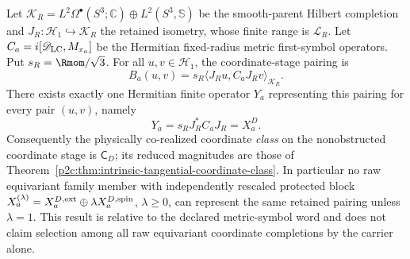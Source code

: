 \documentclass[12pt,a4paper]{article}
\begin{document}
\begin{proposition}
\label{p2c:prop:v265-matrix-element-host-inheritance}
Let \(\mathscr K_R=L^2\Omega^\bullet(S^3;\mathbb C)\oplus
L^2(S^3,\mathbb S)\) be the smooth-parent Hilbert completion and
\(J_R:\mathcal H_1\hookrightarrow\mathscr K_R\) the retained isometry,
whose finite range is \(\mathcal L_R\).  Let
\(C_a=i[\mathscr D_{\rm LC},M_{x_a}]\) be the Hermitian fixed-radius
metric first-symbol operators.  Put \(s_R=\Rmom/\sqrt3\).  For all
\(u,v\in\mathcal H_1\), the coordinate-stage pairing is
\[
 B_a(u,v)=s_R\langle J_Ru,C_aJ_Rv\rangle_{\mathscr K_R}.
\]
There exists exactly one Hermitian finite operator \(Y_a\) representing this
pairing for every pair \((u,v)\), namely
\[
 \boxed{Y_a=s_RJ_R^*C_aJ_R=X_a^D.}
\]
Consequently the physically co-realized coordinate \emph{class} on the
nonobstructed coordinate stage is \(\mathsf C_D\); its reduced magnitudes
are those of Theorem~\ref{p2c:thm:intrinsic-tangential-coordinate-class}.
In particular no raw equivariant family member with independently rescaled
protected block \(X_a^{(\lambda)}=X_a^{D,{\rm ext}}\oplus
\lambda X_a^{D,{\rm spin}}\), \(\lambda\geq0\), can represent the
same retained pairing unless \(\lambda=1\).  This result is relative to
the declared metric-symbol word and does not claim selection among all raw
equivariant coordinate completions by the carrier alone.
\end{proposition}
\end{document}
